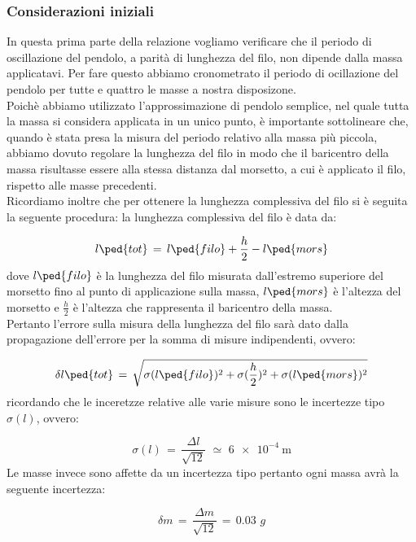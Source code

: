 \subsubsection{Considerazioni iniziali}
In questa prima parte della relazione vogliamo verificare che il periodo di oscillazione del pendolo, a parità di lunghezza del filo, non dipende dalla massa applicatavi.
Per fare questo abbiamo cronometrato il periodo di ocillazione del pendolo per tutte e quattro le masse a nostra disposizone.\\
Poichè abbiamo utilizzato l'approssimazione di pendolo semplice, nel quale tutta la massa si considera applicata in un unico punto, è importante sottolineare che, quando è stata presa la misura del periodo relativo alla massa più piccola, abbiamo dovuto regolare la lunghezza del filo in modo che il baricentro della massa risultasse essere alla stessa distanza dal morsetto, a cui è applicato il filo, rispetto alle masse precedenti.\\
Ricordiamo inoltre che per ottenere la lunghezza complessiva del filo si è seguita la seguente procedura: la lunghezza complessiva del filo è data da:

\begin{equation}
	l\ped{tot} \,=\, l\ped{filo} + \frac{h}{2} - l\ped{mors}
\end{equation}
%
dove $l\ped{filo}$ è la lunghezza del filo misurata dall'estremo superiore del morsetto fino al punto di applicazione sulla massa, $l\ped{mors}$ è l'altezza del morsetto e $\frac{h}{2}$ è l'altezza che rappresenta il baricentro della massa.\\
Pertanto l'errore sulla misura della lunghezza del filo sarà dato dalla propagazione dell'errore per la somma di misure indipendenti, ovvero:

\begin{equation*}
	\delta l\ped{tot} \,=\, \sqrt{\sigma (l\ped{filo})^2 + \sigma (\frac{h}{2})^2 + \sigma (l\ped{mors})^2}
\end{equation*}
%
ricordando che le inceretzze relative alle varie misure sono le incertezze tipo $\sigma (l)$, ovvero:

\begin{equation*}
	\sigma (l) \,=\, \frac{\Delta l}{\sqrt{12}} \,\, \simeq \,\, \SI{6e-4}{\meter}
\end{equation*}
%
Le masse invece sono affette da un incertezza tipo pertanto ogni massa avrà la seguente incertezza:

\begin{equation*}
	\delta m \,=\, \frac{\Delta m}{\sqrt{12}} \,=\, 0.03 \,\, g
\end{equation*}

